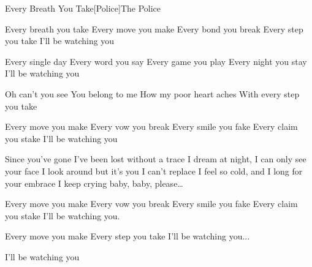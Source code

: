 \begin{Song}{Every Breath You Take}[Police]{The Police}
\begin{multicols}{2}

\begin{Verse}
Every breath you take
Every move you make
Every bond you break
Every step you take
I'll be watching you
\espaceInterStrophe

Every single day
Every word you say
Every game you play
Every night you stay
I'll be watching you
\end{Verse}
\espaceInterStrophe

\begin{Chorus}
Oh can't you see
You belong to me
How my poor heart aches
With every step you take
\end{Chorus}
\espaceInterStrophe

\begin{Verse}
Every move you make
Every vow you break
Every smile you fake
Every claim you stake
I'll be watching you
\end{Verse}
\columnbreak

\begin{Bridge}
Since you've gone I've been lost without a trace
I dream at night, I can only see your face
I look around but it's you I can't replace
I feel so cold, and I long for your embrace
I keep crying baby, baby, please\dots
\end{Bridge}
\espaceInterStrophe

\tochorus
\espaceInterStrophe

\begin{Verse}
Every move you make
Every vow you break
Every smile you fake
Every claim you stake
I'll be watching you.
\espaceInterStrophe

Every move you make
Every step you take
I'll be watching you...
\espaceInterStrophe

I'll be watching you
\end{Verse}
\vfill
~

\end{multicols}

\vfill

\begin{multicols}{2}

\gridGroupNormal

\begin{Chords}
\hline
\\\hline
\end{Chords}
\espaceInterGrille


\begin{Chords}
\hline
\\\hline
\end{Chords}

\end{multicols}

\vfill

\end{Song}
